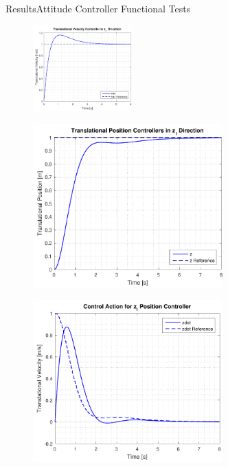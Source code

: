 \begin{frame}{Results}{Attitude Controller Functional Tests}
    
    \begin{figure}[H]
        \centering
        \includegraphics[width=0.34\textwidth]{figures/zdotStep}  
      \end{figure} 
      
      \begin{minipage}{\linewidth}
          \begin{minipage}{0.49\linewidth}
              \begin{figure}[H]
                  \centering
                  \includegraphics[width=0.65\textwidth]{figures/zStep}  
              \end{figure}   
          \end{minipage}
          \hspace{0.03\linewidth}
          \begin{minipage}{0.49\linewidth}
              \begin{figure}[H]
                  \centering
                  \includegraphics[width=0.65\textwidth]{figures/zStepAction}  
              \end{figure}               
          \end{minipage}
      \end{minipage}  
\end{frame}

